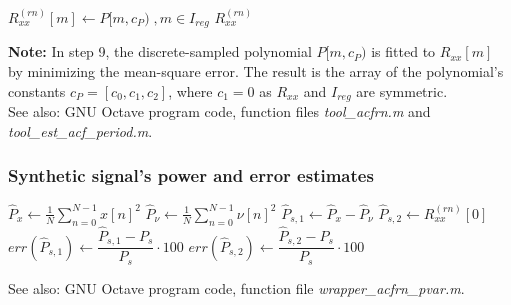 \documentclass[11pt,aspectratio=169]{beamer}
\begin{document}
\begin{frame}[allowframebreaks]
\begin{algorithmic}[1]
			\State $R_{xx}^{(rn)}[m] \gets P[m,c_P) \; , m \in I_{reg}$
			\State \Return $R_{xx}^{(rn)}$
		\end{algorithmic}
		\vspace*{.5em}
		\small \textbf{Note:} In step 9, the discrete-sampled polynomial $P[m,c_P)$ is fitted to $R_{xx}[m]$ by minimizing the mean-square error. The result is the array of the polynomial's constants $c_P = [c_0, c_1, c_2]$, where $c_1 = 0$ as $R_{xx}$ and $I_{reg}$ are symmetric.\\
		See also: GNU Octave program code\cite{progcode}, function files \textsl{tool\_acfrn.m} and \textsl{tool\_est\_acf\_period.m}.
	\end{frame}
	\begin{frame}
		\frametitle{\appendixname{} \textemdash{} Synthetic signal's power and error estimates}\label{app:powestsyn}
		\begin{algorithmic}
			\State $\hat{P}_x \gets \frac{1}{N} \sum\limits_{n=0}^{N-1} x[n]^2$
			\State $\hat{P}_{\nu} \gets \frac{1}{N} \sum\limits_{n=0}^{N-1} \nu[n]^2$
			\State $\hat{P}_{s,1} \gets \hat{P}_x - \hat{P}_{\nu}$
			\State $\hat{P}_{s,2} \gets R_{xx}^{(rn)}[0]$
			\State $err(\hat{P}_{s,1}) \gets \dfrac{\hat{P}_{s,1} - P_s}{P_s} \cdot 100$
			\State $err(\hat{P}_{s,2}) \gets \dfrac{\hat{P}_{s,2} - P_s}{P_s} \cdot 100$
		\end{algorithmic}
		\vspace*{.5em}
		\small See also: GNU Octave program code\cite{progcode}, function file \textsl{wrapper\_acfrn\_pvar.m}.
	\end{frame}
\end{document}

